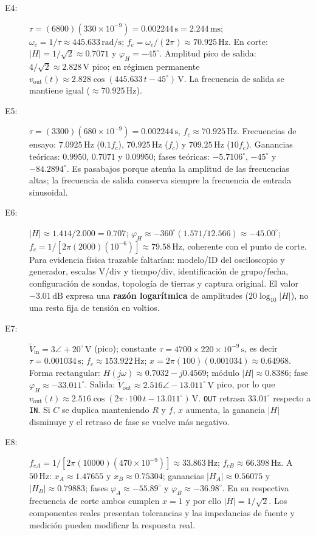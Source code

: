 \documentclass[11pt, a4paper]{article}
\newcommand{\phasor}[1]{\widetilde{#1}}
\begin{document}
\begin{description}
    \item[E4:] $\tau = (6800)(330\times 10^{-9}) = 0.002244\,\text{s} = 2.244\,\text{ms}$; $\omega_c = 1/\tau \approx 445.633\,\text{rad/s}$; $f_c = \omega_c/(2\pi) \approx 70.925\,\text{Hz}$. En corte: $|H| = 1/\sqrt{2} \approx 0.7071$ y $\varphi_H = -45^\circ$. Amplitud pico de salida: $4/\sqrt{2} \approx 2.828\,\text{V}$ pico; en régimen permanente $v_{\text{out}}(t) \approx 2.828\cos(445.633\,t - 45^\circ)\,\text{V}$. La frecuencia de salida se mantiene igual ($\approx 70.925\,\text{Hz}$).

    \item[E5:] $\tau = (3300)(680\times 10^{-9}) = 0.002244\,\text{s}$, $f_c \approx 70.925\,\text{Hz}$. Frecuencias de ensayo: $7.0925\,\text{Hz}$ ($0.1f_c$), $70.925\,\text{Hz}$ ($f_c$) y $709.25\,\text{Hz}$ ($10f_c$). Ganancias teóricas: $0.9950$, $0.7071$ y $0.09950$; fases teóricas: $-5.7106^\circ$, $-45^\circ$ y $-84.2894^\circ$. Es pasabajos porque atenúa la amplitud de las frecuencias altas; la frecuencia de salida conserva siempre la frecuencia de entrada sinusoidal.

    \item[E6:] $|H| \approx 1.414/2.000 = 0.707$; $\varphi_H \approx -360^\circ (1.571/12.566) \approx -45.00^\circ$; $f_c = 1/[2\pi(2000)(10^{-6})] \approx 79.58\,\text{Hz}$, coherente con el punto de corte. Para evidencia física trazable faltarían: modelo/ID del osciloscopio y generador, escalas V/div y tiempo/div, identificación de grupo/fecha, configuración de sondas, topología de tierras y captura original. El valor $-3.01\,\text{dB}$ expresa una \textbf{razón logarítmica} de amplitudes ($20\log_{10}|H|$), no una resta fija de tensión en voltios.

    \item[E7:] $\phasor{V}_{\text{in}} = 3\angle +20^\circ\,\text{V}$ (pico); constante $\tau = 4700 \times 220\times 10^{-9}\,\text{s}$, es decir $\tau = 0.001034\,\text{s}$; $f_c \approx 153.922\,\text{Hz}$; $x = 2\pi(100)(0.001034) \approx 0.64968$. Forma rectangular: $H(j\omega) \approx 0.7032 - j0.4569$; módulo $|H| \approx 0.8386$; fase $\varphi_H \approx -33.011^\circ$. Salida: $\phasor{V}_{\text{out}} \approx 2.516\angle -13.011^\circ\,\text{V}$ pico, por lo que $v_{\text{out}}(t) \approx 2.516\cos(2\pi\cdot 100\,t - 13.011^\circ)\,\text{V}$. \texttt{OUT} retrasa $33.01^\circ$ respecto a \texttt{IN}. Si $C$ se duplica manteniendo $R$ y $f$, $x$ aumenta, la ganancia $|H|$ disminuye y el retraso de fase se vuelve más negativo.

    \item[E8:] $f_{cA} = 1/[2\pi(10000)(470\times 10^{-9})] \approx 33.863\,\text{Hz}$; $f_{cB} \approx 66.398\,\text{Hz}$. A $50\,\text{Hz}$: $x_A \approx 1.47655$ y $x_B \approx 0.75304$; ganancias $|H_A| \approx 0.56075$ y $|H_B| \approx 0.79883$; fases $\varphi_A \approx -55.89^\circ$ y $\varphi_B \approx -36.98^\circ$. En su respectiva frecuencia de corte ambos cumplen $x=1$ y por ello $|H| = 1/\sqrt{2}$. Los componentes reales presentan tolerancias y las impedancias de fuente y medición pueden modificar la respuesta real.
\end{description}
\end{document}
